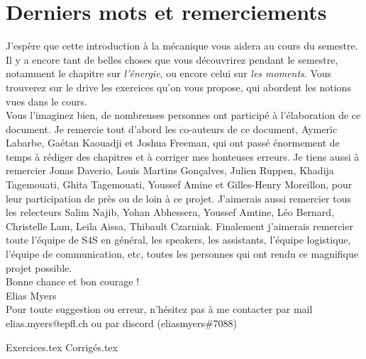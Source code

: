 \documentclass{article}
\begin{document}
\section*{Derniers mots et remerciements} 
\noindent J'espère que cette introduction à la mécanique vous aidera au cours du semestre. Il y a encore tant de belles choses que vous découvrirez pendant le semestre, notamment le chapitre sur  \textit{l'énergie}, ou encore celui sur \textit{les moments}. Vous trouverez sur le drive les exercices qu'on vous propose, qui abordent les notions vues dans le cours.\\

\noindent Vous l'imaginez bien, de nombreuses personnes ont participé à l'élaboration de ce document. Je remercie tout d'abord les co-auteurs de ce document, Aymeric Labarbe, Gaétan Kaouadji et Joshua Freeman, qui ont passé énormement de temps à rédiger des chapitres et à corriger mes honteuses erreurs. Je tiens aussi à remercier Jonas Daverio, Louis Martins Gonçalves, Julien Ruppen, Khadija Tagemouati, Ghita Tagemouati, Youssef Amine et Gilles-Henry Moreillon, pour leur participation de près ou de loin à ce projet. J'aimerais aussi remercier tous les relecteurs Salim Najib, Yohan Abhessera, Youssef Amtine, Léo Bernard, Christelle Lam, Leila Aissa, Thibault Czarniak. Finalement j'aimerais remercier toute l'équipe de S4S en général, les speakers, les assistants, l'équipe logistique, l'équipe de communication, etc, toutes les personnes qui ont rendu ce magnifique projet possible. \\

\noindent Bonne chance et bon courage ! \\

\noindent Elias Myers \\

\noindent Pour toute suggestion ou erreur, n'hésitez pas à me contacter par mail elias.myers@epfl.ch ou par discord (eliasmyers\#7088)



\newpage

{Exercices.tex}
\newpage
{Corrigés.tex}
\newpage

\end{document}
